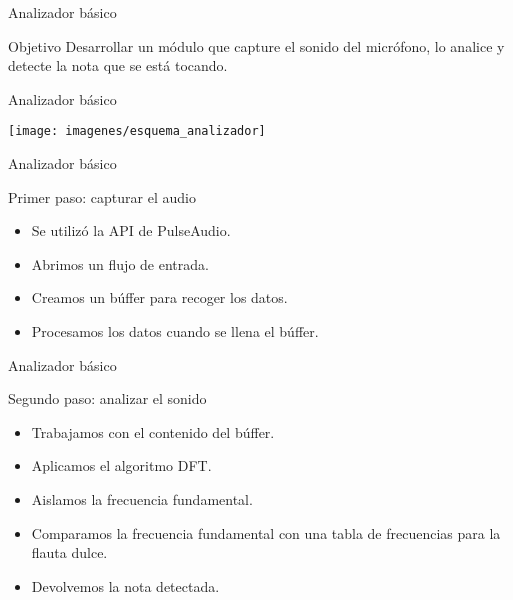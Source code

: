 \begin{frame}{Analizador básico}
  \begin{block}{Objetivo}
    Desarrollar un módulo que capture el sonido del micrófono, lo analice y
    detecte la nota que se está tocando.
  \end{block}

\end{frame}

\begin{frame}{Analizador básico}
  \begin{center}
    \texttt{[image: imagenes/esquema\_analizador]}
  \end{center}
\end{frame}

\begin{frame}{Analizador básico}
  \begin{block}{Primer paso: capturar el audio}
    \begin{itemize}
    \item Se utilizó la API de PulseAudio.
    \item Abrimos un flujo de entrada.
    \item Creamos un búffer para recoger los datos.
    \item Procesamos los datos cuando se llena el búffer.
    \end{itemize}
    
  \end{block}
\end{frame}

\begin{frame}{Analizador básico}
  \begin{block}{Segundo paso: analizar el sonido}
    \begin{itemize}
    \item Trabajamos con el contenido del búffer.
    \item Aplicamos el algoritmo DFT.
    \item Aislamos la frecuencia fundamental.
    \item Comparamos la frecuencia fundamental con una tabla de frecuencias para
      la flauta dulce.
    \item Devolvemos la nota detectada.
    \end{itemize}
  \end{block}  
\end{frame}

